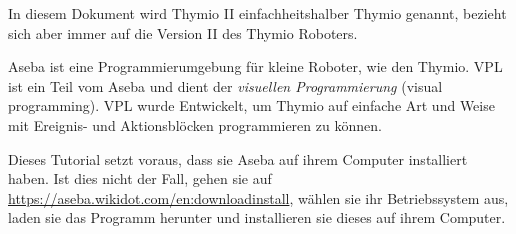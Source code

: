 In diesem Dokument wird Thymio II einfachheitshalber Thymio genannt, bezieht sich aber immer auf die Version II des Thymio Roboters.

Aseba ist eine Programmierumgebung für kleine Roboter, wie den Thymio. VPL ist ein Teil
vom Aseba und dient der \emph{visuellen Programmierung} (visual programming). VPL wurde Entwickelt, um Thymio auf einfache Art und Weise mit Ereignis- und Aktionsblöcken programmieren zu können.

Dieses Tutorial setzt voraus, dass sie Aseba auf ihrem Computer installiert haben. Ist dies nicht der Fall, gehen sie auf
 \url{https://aseba.wikidot.com/en:downloadinstall}, wählen sie ihr Betriebssystem aus, laden sie das Programm herunter und installieren sie dieses auf ihrem Computer. 

